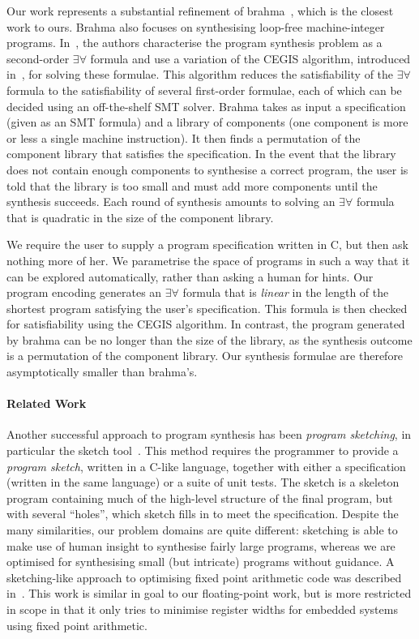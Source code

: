 Our work represents a substantial refinement of {\sc brahma}~\cite{brahma},
which is the closest work to ours.  {\sc Brahma} also focuses on
synthesising loop-free machine-integer programs.  In~\cite{brahma}, the
authors characterise the program synthesis problem as a second-order
$\exists \forall$ formula and use a variation of the CEGIS algorithm,
introduced in~\cite{lezama-thesis}, for solving
these formulae.  This algorithm reduces the satisfiability of the $\exists
\forall$ formula to the satisfiability of several first-order formulae, each
of which can be decided using an off-the-shelf SMT solver.  {\sc Brahma}
takes as input a specification (given as an SMT formula) and a library of
components (one component is more or less a single machine instruction).  It
then finds a permutation of the component library that satisfies the
specification.  In the
event that the library does not contain enough components to synthesise a
correct program, the user is told that the library is too small and
must add more components until the synthesis succeeds.  Each round of
synthesis amounts to solving an $\exists \forall$ formula that is quadratic
in the size of the component library.

We require the user to supply a program specification written in C, but then
ask nothing more of her.  We parametrise the space of programs in such a way
that it can be explored automatically, rather than asking a human for hints.
Our program encoding generates an $\exists
\forall$ formula that is \emph{linear} in the length of the shortest program
satisfying the user's specification.  This formula is then checked for satisfiability
using the CEGIS algorithm.  In contrast, the program generated by {\sc
brahma} can be no longer than the size of the library, as the synthesis
outcome is a permutation of the component library.  Our synthesis
formulae are therefore asymptotically smaller than {\sc brahma}'s.

\paragraph{Related Work}

Another successful approach to program synthesis has been \emph{program
sketching}, in particular the {\sc sketch} tool~\cite{lezama-thesis,sketch,modular-sketch}.  This method
requires the programmer to provide a \emph{program sketch}, written in a
C-like language, together with either a specification (written in the same
language) or a suite of unit tests.  The sketch is a skeleton program
containing much of the high-level structure of the final program, but with
several ``holes'', which {\sc sketch} fills in to meet the specification.
Despite the many similarities, our problem domains are quite different:
sketching is able to make use of human insight to synthesise fairly large
programs, whereas we are optimised for synthesising small (but intricate)
programs without guidance.  A sketching-like approach to optimising
fixed point arithmetic code was described in~\cite{eldib-wang}.  This
work is similar in goal to our floating-point work, but is more restricted
in scope in that it only tries to minimise register widths for embedded
systems using fixed point arithmetic.

